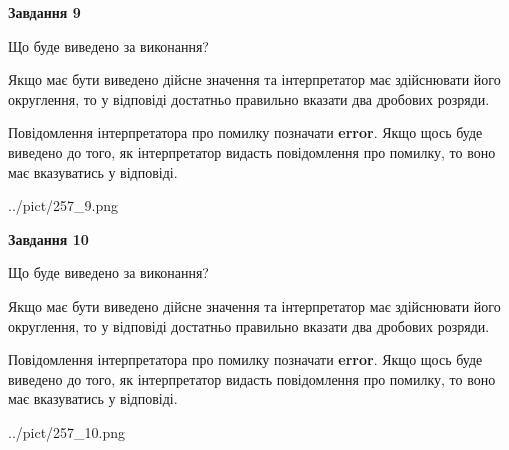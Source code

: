 \documentclass[12pt, ukrainian]{article}
\begin{document}
{\begin {Large}
{\begin {center}\textbf{Завдання 9}\end {center}}\par
Що буде виведено за виконання? \par

Якщо має бути виведено дійсне значення та інтерпретатор має здійснювати його округлення, 
то у відповіді достатньо правильно вказати два дробових розряди.

Повідомлення інтерпретатора про помилку позначати \textbf{error}.
Якщо щось буде виведено до того, як інтерпретатор видасть повідомлення про помилку, 
то воно має вказуватись у відповіді. \par

\begin{center}
	{../pict/257_9.png}
\end{center}
\newpage

{\begin {center}\textbf{Завдання 10}\end {center}}\par
Що буде виведено за виконання? \par

Якщо має бути виведено дійсне значення та інтерпретатор має здійснювати його округлення, 
то у відповіді достатньо правильно вказати два дробових розряди.

Повідомлення інтерпретатора про помилку позначати \textbf{error}.
Якщо щось буде виведено до того, як інтерпретатор видасть повідомлення про помилку, 
то воно має вказуватись у відповіді. \par

\begin{center}
	{../pict/257_10.png}
\end{center}
\newpage

\end {Large}}
\end{document}
